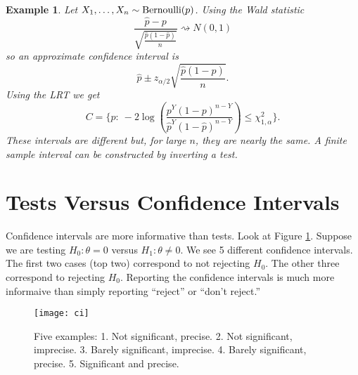 \documentclass[twoside,12pt]{article}
\newtheorem{example}[theorem]{Example}
\begin{document}
\begin{example}
Let $X_1,\ldots, X_n \sim {\rm Bernoulli}(p)$.
Using the Wald statistic
$$
\frac{\widehat{p} -p}{\sqrt{ \frac{\widehat{p}(1-\widehat{p})}{n}}} \rightsquigarrow N(0,1)
$$
so an approximate confidence interval is
$$
\widehat p \pm z_{\alpha/2} \sqrt{ \frac{\widehat{p}(1-\widehat{p})}{n}}.
$$
Using the LRT we get
$$
C = \Biggl\{ p:\ 
-2 \log \left(\frac{ p^Y (1-p)^{n-Y}}{ \widehat{p}^Y (1-\widehat{p})^{n-Y}}\right) \leq \chi^2_{1,\alpha}\Biggr\}.
$$
These intervals are different but, for large $n$, they are nearly the same.
A finite sample interval can be constructed by inverting a test.

\end{example}


\section{Tests Versus Confidence Intervals}

Confidence intervals are more informative than tests.
Look at Figure \ref{fig::testversusci}.
Suppose we are testing $H_0:\theta =0$ versus $H_1:\theta \neq 0$.
We see 5 different confidence intervals.
The first two cases (top two) correspond to not rejecting $H_0$.
The other three correspond to rejecting $H_0$.
Reporting the  confidence intervals is much more informaive than
simply reporting ``reject'' or ``don't reject.''



\begin{figure}
\vspace{-1in}
\begin{center}
\texttt{[image: ci]}
\end{center}
\caption{Five examples:
1. Not significant, precise.
2. Not significant, imprecise.
3. Barely significant, imprecise.
4. Barely significant, precise.
5. Significant and precise.}
\label{fig::testversusci}
\end{figure}
\end{document}
